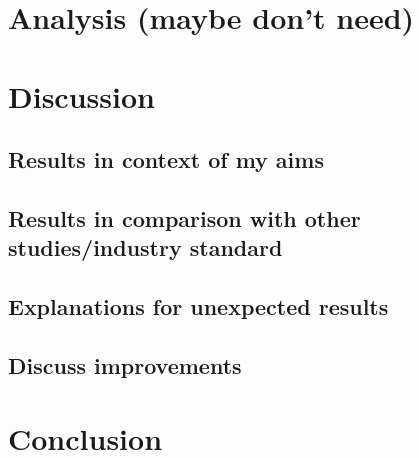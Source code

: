 \documentclass[aps,pra,a4paper,nofootinbib,onecolumn,tightenlines,longbibliography,12pt,amsfonts,amssymb,amsmath,floatfix]{revtex4-2} %
\begin{document}
  
\section{Analysis (maybe don't need)}
\label{sec:Analysis}


\section{Discussion} %
\label{sec:Discussion}


  \subsection{Results in context of my aims} %
  \label{sub:Results in context of my aims}

  \subsection{Results in comparison with other studies/industry standard} %
  \label{sub:Results in comparison with other studies/industry standard}
  
  \subsection{Explanations for unexpected results} %
  \label{sub:Explanations for unexpected results}
  
  \subsection{Discuss improvements} %
  \label{sub:Discuss improvement}



\section{Conclusion} %
\label{sec:Conclusion}





\end{document}
